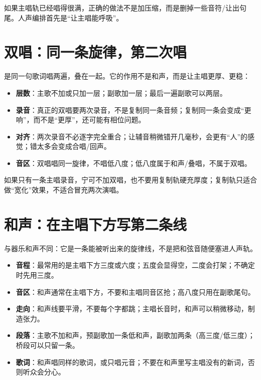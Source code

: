 如果主唱轨已经唱得很满，正确的做法不是加压缩，而是删掉一些音符/让出句尾。人声编排首先是“让主唱能呼吸”。

\section{双唱：同一条旋律，第二次唱}
\label{sec:double}

是同一句歌词唱两遍，叠在一起。它的作用不是和声，而是让主唱更厚、更稳：

\begin{itemize}
\item \textbf{层数}：主歌不加或只加一层；副歌加一层；最后一遍副歌可以两层。
\item \textbf{录音}：真正的双唱要两次录音，不是复制同一条音频；复制同一条会变成“更响”，而不是“更厚”，还可能有相位问题。
\item \textbf{对齐}：两次录音不必逐字完全重合；让辅音稍微错开几毫秒，会更有“人”的感觉；错太多会变成合唱/回声。
\item \textbf{音区}：双唱唱同一旋律，不唱低八度；低八度属于和声/叠唱，不属于双唱。
\end{itemize}

如果只有一条主唱录音，宁可不加双唱，也不要用复制轨硬充厚度；复制轨只适合做“宽化”效果，不适合冒充两次演唱。

\section{和声：在主唱下方写第二条线}
\label{sec:harmony}

与器乐和声不同：它是一条能被听出来的旋律线，不是把和弦音随便塞进人声轨。

\begin{itemize}
\item \textbf{音程}：最常用的是主唱下方三度或六度；五度会显得空，二度会打架；不确定时先用三度。
\item \textbf{音区}：和声通常在主唱下方，不要和主唱同音区抢；高八度只用在副歌尾句。
\item \textbf{走向}：和声线要平滑，不要每个字都跳；主唱长音时，和声可以稍微移动，制造张力。
\item \textbf{段落}：主歌不加和声，预副歌加一条低和声，副歌加两条（高三度/低三度）；桥段可以只留一条。
\item \textbf{歌词}：和声唱同样的歌词，或只唱元音；不要在和声里写主唱没有的新词，否则听众会分心。
\end{itemize}

